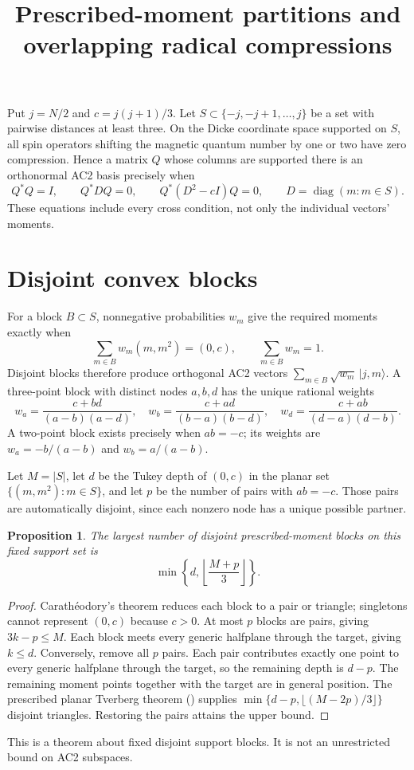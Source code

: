 \documentclass[11pt]{article}
\newtheorem{proposition}{Proposition}
\begin{document}
\title{Prescribed-moment partitions and overlapping radical compressions}
\author{}\date{}\maketitle
Put $j=N/2$ and $c=j(j+1)/3$. Let $S\subset\{-j,-j+1,\ldots,j\}$
be a set with pairwise distances at least three. On the Dicke coordinate
space supported on $S$, all spin operators shifting the magnetic quantum
number by one or two have zero compression. Hence a matrix $Q$ whose
columns are supported there is an orthonormal AC2 basis precisely when
\[
 Q^*Q=I,\qquad Q^*DQ=0,\qquad Q^*(D^2-cI)Q=0,
 \qquad D=\operatorname{diag}(m:m\in S).
\]
These equations include every cross condition, not only the individual
vectors' moments.

\section*{Disjoint convex blocks}
For a block $B\subset S$, nonnegative probabilities $w_m$ give the required
moments exactly when
\[
 \sum_{m\in B}w_m(m,m^2)=(0,c),\qquad\sum_{m\in B}w_m=1.
\]
Disjoint blocks therefore produce orthogonal AC2 vectors
$\sum_{m\in B}\sqrt{w_m}\,|j,m\rangle$. A three-point block with distinct
nodes $a,b,d$ has the unique rational weights
\[
 w_a=\frac{c+bd}{(a-b)(a-d)},\quad
 w_b=\frac{c+ad}{(b-a)(b-d)},\quad
 w_d=\frac{c+ab}{(d-a)(d-b)}.
\]
A two-point block exists precisely when $ab=-c$; its weights are
$w_a=-b/(a-b)$ and $w_b=a/(a-b)$.

Let $M=|S|$, let $d$ be the Tukey depth of $(0,c)$ in the planar set
$\{(m,m^2):m\in S\}$, and let $p$ be the number of pairs with $ab=-c$.
Those pairs are automatically disjoint, since each nonzero node has a
unique possible partner.
\begin{proposition}
The largest number of disjoint prescribed-moment blocks on this fixed
support set is
\[
 \min\left\{d,\left\lfloor\frac{M+p}{3}\right\rfloor\right\}.
\]
\end{proposition}
\begin{proof}
Carath\'eodory's theorem reduces each block to a pair or triangle; singletons
cannot represent $(0,c)$ because $c>0$. At most $p$ blocks are pairs, giving
$3k-p\le M$. Each block meets every generic halfplane through the target,
giving $k\le d$. Conversely, remove all $p$ pairs. Each pair contributes
exactly one point to every generic halfplane through the target, so the
remaining depth is $d-p$. The remaining moment points together with the
target are in general position. The prescribed planar Tverberg theorem
(\cite[Theorem 7]{hp}) supplies
$\min\{d-p,\lfloor(M-2p)/3\rfloor\}$ disjoint triangles. Restoring the
pairs attains the upper bound.
\end{proof}
This is a theorem about fixed disjoint support blocks. It is not an
unrestricted bound on AC2 subspaces.
\end{document}
